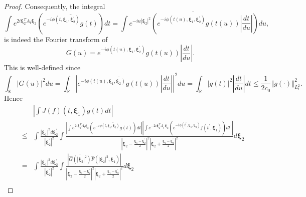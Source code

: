 \documentclass[reqno]{amsart}
\theoremstyle{plain}
\numberwithin{equation}{section}
\begin{document}
\begin{proof}
Consequently, the integral\begin{equation*}
\int e^{2i\mathbf{\xi }_{2}^{T}A_{t}\mathbf{\xi }_{2}}\left( \overline{e^{-i\phi (t,\mathbf{\xi }_{1},\mathbf{\xi }_{2}^{\prime })}g(t)}\right) dt=\overline{\int e^{-iu\left\vert \mathbf{\xi }_{2}\right\vert ^{2}}\left(
e^{-i\phi (t(u),\mathbf{\xi }_{1},\mathbf{\xi }_{2}^{\prime
})}g(t(u))\left\vert \frac{dt}{du}\right\vert \right) du},
\end{equation*}is indeed the Fourier transform of\begin{equation*}
G(u)=e^{-i\phi (t(u),\mathbf{\xi }_{1},\mathbf{\xi }_{2}^{\prime
})}g(t(u))\left\vert \frac{dt}{du}\right\vert .
\end{equation*}This is well-defined since\begin{equation*}
\int_{\mathbb{R}}\left\vert G(u)\right\vert ^{2}du=\int_{\mathbb{R}}\left\vert \overline{e^{-i\phi (t(u),\mathbf{\xi }_{1},\mathbf{\xi }_{2})}g(t(u))}\left\vert \frac{dt}{du}\right\vert \right\vert ^{2}du=\int_{\mathbb{R}}\left\vert g(t)\right\vert ^{2}\left\vert \frac{dt}{du}\right\vert dt\leqslant \frac{1}{2c_{0}}\left\Vert g(\cdot )\right\Vert
_{L_{t}^{2}}^{2}.
\end{equation*}Hence\begin{eqnarray*}
&&\left\vert \int J(f)(t,\mathbf{\xi }_{1})\overline{g(t)}dt\right\vert \\
&\leqslant &\int \frac{\left\vert \mathbf{\xi }_{1}\right\vert ^{2}d\mathbf{\xi }_{2}^{\prime }}{\left\vert \mathbf{\xi }_{2}^{\prime }\right\vert ^{2}}\int \frac{\left\vert \int e^{2i\mathbf{\xi }_{2}^{T}A_{t}\mathbf{\xi }_{2}}\left( \overline{e^{-i\phi (t,\mathbf{\xi }_{1},\mathbf{\xi }_{2})}g(t)}\right) dt\right\vert \left\vert \int e^{-2i\mathbf{\xi }_{2}^{T}A_{t^{\prime }}\mathbf{\xi }_{2}}\left( e^{-i\phi (t^{\prime },\mathbf{\xi }_{1},\mathbf{\xi }_{2})}f(t^{\prime },\mathbf{\xi }_{1})\right) dt^{\prime
}\right\vert }{\left\vert \mathbf{\xi }_{2}-\frac{\mathbf{\xi }_{1}-\mathbf{\xi }_{2}^{\prime }}{2}\right\vert ^{2}\left\vert \mathbf{\xi }_{2}+\frac{\mathbf{\xi }_{1}-\mathbf{\xi }_{2}^{\prime }}{2}\right\vert ^{2}}d\mathbf{\xi }_{2} \\
&=&\int \frac{\left\vert \mathbf{\xi }_{1}\right\vert ^{2}d\mathbf{\xi }_{2}^{\prime }}{\left\vert \mathbf{\xi }_{2}^{\prime }\right\vert ^{2}}\int 
\frac{\left\vert \overline{\hat{G}(\left\vert \mathbf{\xi }_{2}\right\vert
^{2})}\hat{F}(\left\vert \mathbf{\xi }_{2}\right\vert ^{2},\mathbf{\xi }_{1})\right\vert }{\left\vert \mathbf{\xi }_{2}-\frac{\mathbf{\xi }_{1}-\mathbf{\xi }_{2}^{\prime }}{2}\right\vert ^{2}\left\vert \mathbf{\xi }_{2}+\frac{\mathbf{\xi }_{1}-\mathbf{\xi }_{2}^{\prime }}{2}\right\vert ^{2}}d\mathbf{\xi }_{2} \\

\end{eqnarray*}
\end{proof}
\end{document}
